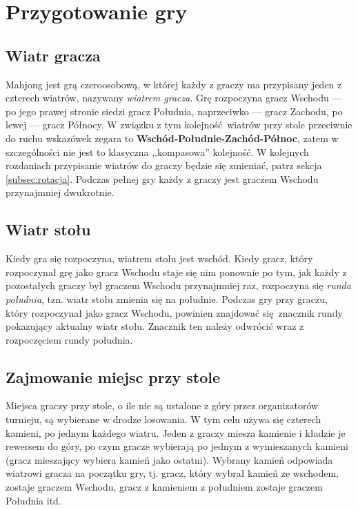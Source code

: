 \newpage
\section{Przygotowanie gry}

\subsection{Wiatr gracza}
Mahjong jest grą czeroosobową, w której każdy z graczy ma przypisany jeden z
czterech wiatrów, nazywany \emph{wiatrem gracza}.
Grę rozpoczyna gracz Wschodu --- po jego prawej stronie siedzi gracz Południa,
naprzeciwko --- gracz Zachodu, po lewej --- gracz Północy.
W związku z tym kolejność wiatrów przy stole przeciwnie do ruchu wskazówek
zegara to \textbf{Wschód-Południe-Zachód-Północ}, zatem w szczególności nie jest
to klasyczna ,,kompasowa'' kolejność.
W kolejnych rozdaniach przypisanie wiatrów do graczy będzie się zmieniać, patrz
sekcja \ref{subsec:rotacja}.
Podczas pełnej gry każdy z graczy jest graczem Wschodu przynajmniej dwukrotnie.

\subsection{Wiatr stołu}
Kiedy gra się rozpoczyna, wiatrem stołu jest wschód.
Kiedy gracz, który rozpoczynał grę jako gracz Wschodu staje się nim ponownie po
tym, jak każdy z pozostałych graczy był graczem Wschodu przynajmniej raz,
rozpoczyna się \emph{runda południa}, tzn. wiatr stołu zmienia się na południe.
Podczas gry przy graczu, który rozpoczynał jako gracz Wschodu, powinien
znajdować się znacznik rundy pokazujący aktualny wiatr stołu.
Znacznik ten należy odwrócić wraz z rozpoczęciem rundy południa.

\subsection{Zajmowanie miejsc przy stole}
Miejsca graczy przy stole, o ile nie są ustalone z góry przez organizatorów
turnieju, są wybierane w drodze losowania.
W tym celu używa się czterech kamieni, po jednym każdego wiatru.
Jeden z graczy miesza kamienie i kładzie je rewersem do góry, po czym gracze
wybierają po jednym z wymieszanych kamieni (gracz mieszający wybiera
kamień jako ostatni).
Wybrany kamień odpowiada wiatrowi gracza na początku gry, tj. gracz, który
wybrał kamień ze wschodem, zostaje graczem Wschodu, gracz z kamieniem z
południem zostaje graczem Południa itd.

